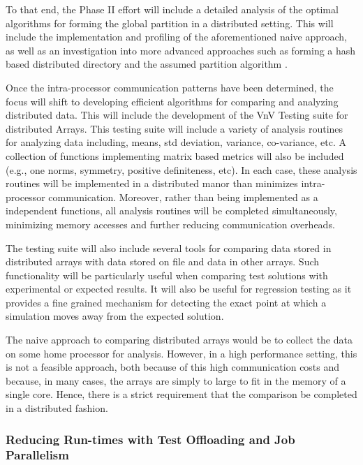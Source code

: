 To that end, the Phase II effort will include a detailed analysis of the optimal algorithms for forming the global partition in a distributed setting. This will include the implementation and profiling of the aforementioned naive approach, as well as an investigation into more advanced approaches such as forming a hash based distributed directory \cite{hpre-nine} and the assumed partition algorithm \cite{hypre-assumed}. 

Once the intra-processor communication patterns have been determined, the focus will shift to developing efficient algorithms for comparing and analyzing distributed data. This will include the development of the VnV Testing suite for distributed Arrays. This testing suite will include a variety of analysis routines for analyzing data including, means, std deviation, variance, co-variance, etc. A collection of functions implementing matrix based metrics will also be included (e.g., one norms, symmetry, positive definiteness, etc). 
In each case, these analysis routines will be implemented in a distributed manor than minimizes intra-processor communication. Moreover, rather than being implemented as a independent functions, all analysis routines will be completed simultaneously, minimizing memory accesses and further reducing communication overheads. 

The testing suite will also include several tools for comparing data stored in distributed arrays with data stored on file and data in other arrays. Such functionality will
be particularly useful when comparing test solutions with experimental or expected results. It will also be useful for regression testing as it provides a fine grained mechanism
for detecting the exact point at which a simulation moves away from the expected solution. 

The naive approach to comparing distributed arrays would be to collect the data on some home processor for analysis. However, in a high performance setting, this is not a feasible approach, both because of this high communication costs and because, in many cases, the arrays are simply to large to fit in the memory of a single core. Hence, there is a strict requirement that the comparison be completed in a distributed fashion. 



\subsubsection{Reducing Run-times with Test Offloading and Job Parallelism}

